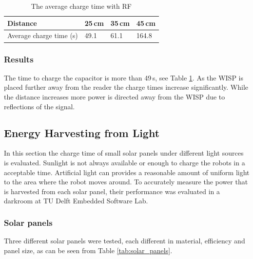 \begin{table}[t]
	\centering
	\caption{The average charge time with RF}
	\label{tab:res_rf_harvest}
	\begin{tabular}{|l||l|l|l|}
		\hline
		Distance & 25\,cm & 35\,cm & 45\,cm \\
		\hline \hline
		Average charge time (s) & 49.1 & 61.1 & 164.8 \\
		\hline
	\end{tabular}
\end{table}

\subsubsection{Results}
The time to charge the capacitor is more than 49\,s, see Table \ref{tab:res_rf_harvest}.
As the WISP is placed further away from the reader the charge times increase significantly.
While the distance increases more power is directed away from the WISP due to reflections of the signal.

\subsection{Energy Harvesting from Light}

In this section the charge time of small solar panels under different light sources is evaluated.
Sunlight is not always available or enough to charge the robots in a acceptable time.
Artificial light can provides a reasonable amount of uniform light to the area where the robot moves around.
To accurately measure the power that is harvested from each solar panel, their performance was evaluated in a darkroom at TU Delft Embedded Software Lab.

\subsubsection{Solar panels}
Three different solar panels were tested, each different in material, efficiency and panel size, as can be seen from Table \ref{tab:solar_panels}.

